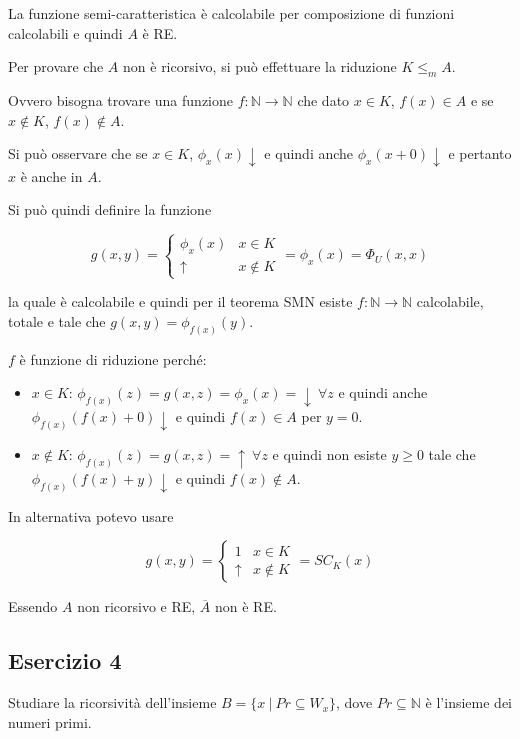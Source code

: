 La funzione semi-caratteristica è calcolabile per composizione di funzioni calcolabili e quindi $A$ è RE.

Per provare che $A$ non è ricorsivo, si può effettuare la riduzione $K \leq_m A$.

Ovvero bisogna trovare una funzione $f : \mathbb{N} \rightarrow \mathbb{N}$ che dato  $x \in K$, $f(x) \in A$ e se $x \notin K$, $f(x) \notin A$.

Si può osservare che se $x \in K$, $\phi_x(x)\downarrow$ e quindi anche $\phi_x(x+0)\downarrow$ e pertanto $x$ è anche in $A$.

Si può quindi definire la funzione 

$$
g(x,y) = \begin{cases}
\phi_x(x) &x \in K \\
\uparrow &x \notin K
\end{cases} = \phi_x(x) = \Phi_U(x,x)
$$

la quale è calcolabile e quindi per il teorema SMN esiste $f : \mathbb{N} \rightarrow \mathbb{N}$ calcolabile, totale e tale che $g(x,y) = \phi_{f(x)}(y)$.

$f $ è funzione di riduzione perché:

\begin{itemize}
	\item $x \in K$: $\phi_{f(x)}(z) = g(x,z) = \phi_x(x) = \downarrow \:\forall z$ e quindi anche $\phi_{f(x)}(f(x) + 0)\downarrow$ e quindi $f(x) \in A$ per $y = 0$.
	\item $x \notin K$: $\phi_{f(x)}(z) = g(x,z)= \uparrow \: \forall z$ e quindi non esiste $y \geq 0$ tale che $\phi_{f(x)}(f(x) + y) \downarrow$ e quindi $f(x) \notin A$.
\end{itemize}

In alternativa potevo usare

$$
g(x,y) = \begin{cases}
1 & x \in K \\
\uparrow & x \notin K
\end{cases} = SC_K(x)
$$

Essendo $A$ non ricorsivo e RE, $\overline{A}$ non è RE.

\subsection{Esercizio 4}

Studiare la ricorsività dell'insieme $B = \{ x \: | \: Pr \subseteq W_x \}$, dove $Pr \subseteq \mathbb{N}$ è l'insieme dei numeri primi.

